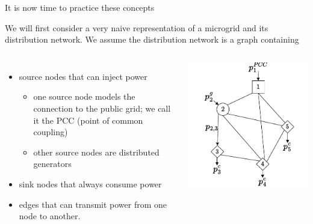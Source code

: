 \begin{frame}{It is now time to practice these concepts}

 We will first consider a very naive representation of a microgrid and its distribution network. We assume the distribution network is a graph containing 
\begin{columns}
\begin{itemize}
    \item source nodes that can inject power
    \begin{itemize}
        \item one source node models the connection to the public grid; we call it the PCC (point of common coupling)
        \item other source nodes are distributed generators
    \end{itemize}
    \item sink nodes that always consume power
    \item edges that can transmit power from one node to another.
\end{itemize}
\includegraphics[width=\textwidth]{images/netwok_flow-Page-1_drawio.pdf}
\end{columns}
\end{frame}



